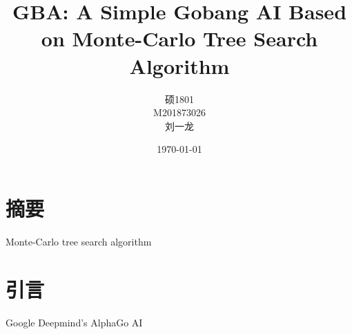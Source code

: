 \documentclass[UTF8]{ctexart}
\title{GBA: A Simple Gobang AI Based on Monte-Carlo Tree Search Algorithm}
\author{硕1801\\ M201873026\\ 刘一龙}
\date{\today}
\begin{document}
\maketitle
\newpage
\tableofcontents
\newpage

\section*{摘要}
Monte-Carlo tree search algorithm\cite{DBLP:conf/ecml/KocsisS06}\cite{DBLP:conf/aiide/ChaslotBSS08}
\newpage

\section{引言}
Google Deepmind's AlphaGo AI\cite{DBLP:journals/nature/SilverHMGSDSAPL16}\cite{silver2017mastering}
\newpage



\end{document}

